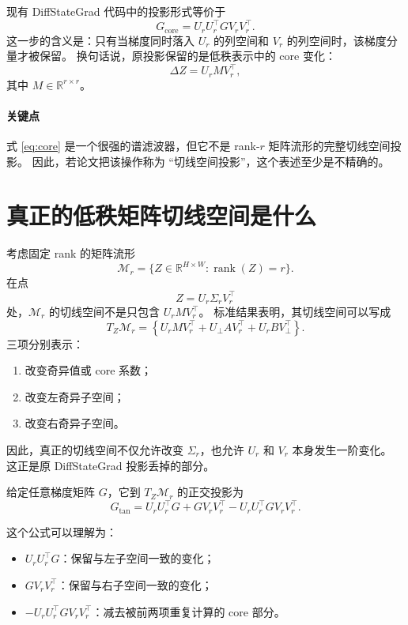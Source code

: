 \documentclass[11pt]{article}
\begin{document}
现有 DiffStateGrad 代码中的投影形式等价于
\[
    \boxed{
    G_{\mathrm{core}}
    = U_r U_r^\top G V_r V_r^\top .
    }
    \label{eq:core}
\]
这一步的含义是：只有当梯度同时落入 $U_r$ 的列空间和 $V_r$ 的列空间时，该梯度分量才被保留。
换句话说，原投影保留的是低秩表示中的 core 变化：
\[
    \Delta Z = U_r M V_r^\top ,
\]
其中 $M \in \mathbb{R}^{r \times r}$。

\paragraph{关键点}
式 \eqref{eq:core} 是一个很强的谱滤波器，但它不是 rank-$r$ 矩阵流形的完整切线空间投影。
因此，若论文把该操作称为 ``切线空间投影''，这个表述至少是不精确的。

\section{真正的低秩矩阵切线空间是什么}

考虑固定 rank 的矩阵流形
\[
    \mathcal{M}_r =
    \{Z \in \mathbb{R}^{H \times W}: \operatorname{rank}(Z)=r\}.
\]
在点
\[
    Z = U_r \Sigma_r V_r^\top
\]
处，$\mathcal{M}_r$ 的切线空间不是只包含 $U_r M V_r^\top$。
标准结果表明，其切线空间可以写成
\[
    T_Z \mathcal{M}_r
    =
    \left\{
    U_r M V_r^\top
    + U_{\perp} A V_r^\top
    + U_r B V_{\perp}^\top
    \right\}.
\]
三项分别表示：
\begin{enumerate}[label=(\arabic*)]
    \item 改变奇异值或 core 系数；
    \item 改变左奇异子空间；
    \item 改变右奇异子空间。
\end{enumerate}

因此，真正的切线空间不仅允许改变 $\Sigma_r$，也允许 $U_r$ 和 $V_r$ 本身发生一阶变化。
这正是原 DiffStateGrad 投影丢掉的部分。

给定任意梯度矩阵 $G$，它到 $T_Z \mathcal{M}_r$ 的正交投影为
\[
    \boxed{
    G_{\mathrm{tan}}
    =
    U_r U_r^\top G
    + G V_r V_r^\top
    - U_r U_r^\top G V_r V_r^\top .
    }
    \label{eq:tangent}
\]

这个公式可以理解为：
\begin{itemize}
    \item $U_r U_r^\top G$：保留与左子空间一致的变化；
    \item $G V_r V_r^\top$：保留与右子空间一致的变化；
    \item $-U_r U_r^\top G V_r V_r^\top$：减去被前两项重复计算的 core 部分。
\end{itemize}
\end{document}
